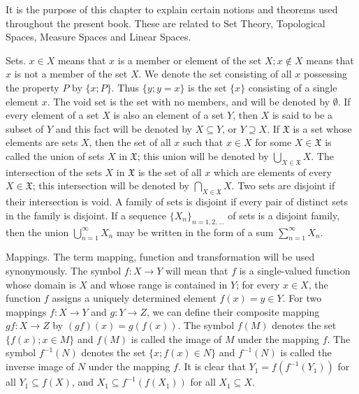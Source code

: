\label{chap:0}

It is the purpose of this chapter to explain certain notions and theorems used throughout the present book. These are related to Set Theory, Topological Spaces, Measure Spaces and Linear Spaces. 


\label{sec:0.1}

Sets. $x \in X$ means that $x$ is a member or element of the set $X; x \notin X$ means that $x$ is not a member of the set $X$. We denote the set consisting of all $x$ possessing the property $P$ by $\{x; P\}$. Thus $\{y; y = x\}$ is the set $\{x\}$ consisting of a single element $x$. The void set is the set with no members, and will be denoted by $\emptyset$. If every element of a set $X$ is also an element of a set $Y$, then $X$ is said to be a subset of $Y$ and this fact will be denoted by $X \subseteq Y$, or $Y \supseteq X$. If $\mathfrak{X}$ is a set whose elements are sets $X$, then the set of all $x$ such that $x \in X$ for some $X \in \mathfrak{X}$ is called the union of sets $X$ in $\mathfrak{X}$; this union will be denoted by $\bigcup\limits_{X \in \mathfrak{X}} X$. The intersection of the sets $X$ in $\mathfrak{X}$ is the set of all $x$ which are elements of every $X \in \mathfrak{X}$; this intersection will be denoted by $\bigcap\limits_{X \in \mathfrak{X}} X$. Two sets are disjoint if their intersection is void. A family of sets is disjoint if every pair of distinct sets in the family is disjoint. If a sequence $\{X_n\}_{n=1,2,\ldots}$ of sets is a disjoint family, then the union $\bigcup\limits_{n=1}^{\infty} X_n$ may be written in the form of a sum $\sum\limits_{n=1}^{\infty} X_n$. 

Mappings. The term mapping, function and transformation will be used synonymously. The symbol $f: X \to Y$ will mean that $f$ is a single-valued function whose domain is $X$ and whose range is contained in $Y$; for every $x \in X$, the function $f$ assigns a uniquely determined element $f(x) = y \in Y$. For two mappings $f: X \to Y$ and $g: Y \to Z$, we can define their composite mapping $gf: X \to Z$ by $(gf)(x) = g(f(x))$. The symbol $f(M)$ denotes the set $\{f(x); x \in M\}$ and $f(M)$ is called the image of $M$ under the mapping $f$. The symbol $f^{-1}(N)$ denotes the set $\{x; f(x) \in N\}$ and $f^{-1}(N)$ is called the inverse image of $N$ under the mapping $f$. It is clear that 
$Y_{1} = f(f^{-1}(Y_{1}))$ for all $Y_{1} \subseteq f(X)$, and $X_{1} \subseteq f^{-1}(f(X_{1}))$ for all $X_{1} \subseteq X$.

